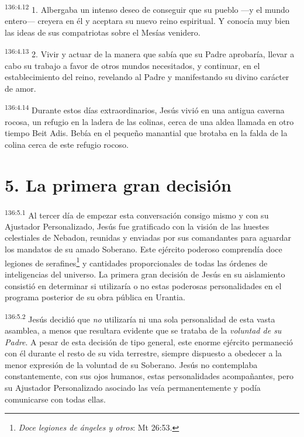 \par 
\textsuperscript{136:4.12} 1. Albergaba un intenso deseo de conseguir que su pueblo ---y el mundo entero--- creyera en él y aceptara su nuevo reino espiritual. Y conocía muy bien las ideas de sus compatriotas sobre el Mesías venidero.

\par 
\textsuperscript{136:4.13} 2. Vivir y actuar de la manera que sabía que su Padre aprobaría, llevar a cabo su trabajo a favor de otros mundos necesitados, y continuar, en el establecimiento del reino, revelando al Padre y manifestando su divino carácter de amor.

\par 
\textsuperscript{136:4.14} Durante estos días extraordinarios, Jesús vivió en una antigua caverna rocosa, un refugio en la ladera de las colinas, cerca de una aldea llamada en otro tiempo Beit Adis. Bebía en el pequeño manantial que brotaba en la falda de la colina cerca de este refugio rocoso.

\section*{5. La primera gran decisión}
\par 
\textsuperscript{136:5.1} Al tercer día de empezar esta conversación consigo mismo y con su Ajustador Personalizado, Jesús fue gratificado con la visión de las huestes celestiales de Nebadon, reunidas y enviadas por sus comandantes para aguardar los mandatos de su amado Soberano. Este ejército poderoso comprendía doce legiones de serafines\footnote{\textit{Doce legiones de ángeles y otros}: Mt 26:53.} y cantidades proporcionales de todas las órdenes de inteligencias del universo. La primera gran decisión de Jesús en su aislamiento consistió en determinar si utilizaría o no estas poderosas personalidades en el programa posterior de su obra pública en Urantia.

\par 
\textsuperscript{136:5.2} Jesús decidió que \textit{no} utilizaría ni una sola personalidad de esta vasta asamblea, a menos que resultara evidente que se trataba de la \textit{voluntad de su Padre}. A pesar de esta decisión de tipo general, este enorme ejército permaneció con él durante el resto de su vida terrestre, siempre dispuesto a obedecer a la menor expresión de la voluntad de su Soberano. Jesús no contemplaba constantemente, con sus ojos humanos, estas personalidades acompañantes, pero su Ajustador Personalizado asociado las veía permanentemente y podía comunicarse con todas ellas.

